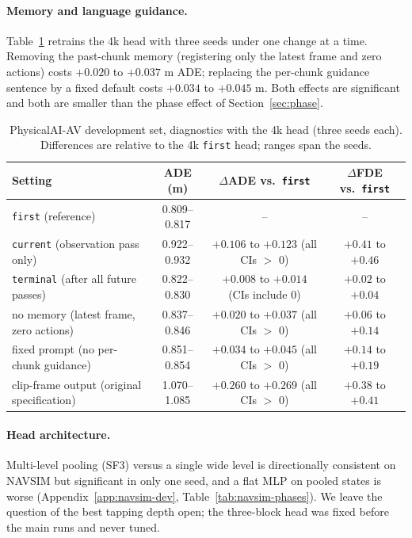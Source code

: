 \documentclass[10pt]{article}
\newcommand{\first}{\texttt{first}}
\newcommand{\current}{\texttt{current}}
\newcommand{\terminal}{\texttt{terminal}}
\begin{document}
\paragraph{Memory and language guidance.} Table~\ref{tab:pai-diag} retrains the 4k head with three seeds under one change at a time. Removing the past-chunk memory (registering only the latest frame and zero actions) costs $+0.020$ to $+0.037$ m ADE; replacing the per-chunk guidance sentence by a fixed default costs $+0.034$ to $+0.045$ m. Both effects are significant and both are smaller than the phase effect of Section~\ref{sec:phase}.

\begin{table}[t]
\caption{PhysicalAI-AV development set, diagnostics with the 4k head (three seeds each). Differences are relative to the 4k \first{} head; ranges span the seeds.}
\label{tab:pai-diag}
\begin{center}
\small
\begin{tabular}{lccc}
\toprule
Setting & ADE (m) & $\Delta$ADE vs.\ \first{} & $\Delta$FDE vs.\ \first{} \\
\midrule
\first{} (reference) & 0.809--0.817 & -- & -- \\
\current{} (observation pass only) & 0.922--0.932 & $+0.106$ to $+0.123$ (all CIs $>$ 0) & $+0.41$ to $+0.46$ \\
\terminal{} (after all future passes) & 0.822--0.830 & $+0.008$ to $+0.014$ (CIs include 0) & $+0.02$ to $+0.04$ \\
no memory (latest frame, zero actions) & 0.837--0.846 & $+0.020$ to $+0.037$ (all CIs $>$ 0) & $+0.06$ to $+0.14$ \\
fixed prompt (no per-chunk guidance) & 0.851--0.854 & $+0.034$ to $+0.045$ (all CIs $>$ 0) & $+0.14$ to $+0.19$ \\
clip-frame output (original specification) & 1.070--1.085 & $+0.260$ to $+0.269$ (all CIs $>$ 0) & $+0.38$ to $+0.41$ \\
\bottomrule
\end{tabular}
\end{center}
\end{table}

\paragraph{Head architecture.} Multi-level pooling (SF3) versus a single wide level is directionally consistent on NAVSIM but significant in only one seed, and a flat MLP on pooled states is worse (Appendix~\ref{app:navsim-dev}, Table~\ref{tab:navsim-phases}). We leave the question of the best tapping depth open; the three-block head was fixed before the main runs and never tuned.
\end{document}
